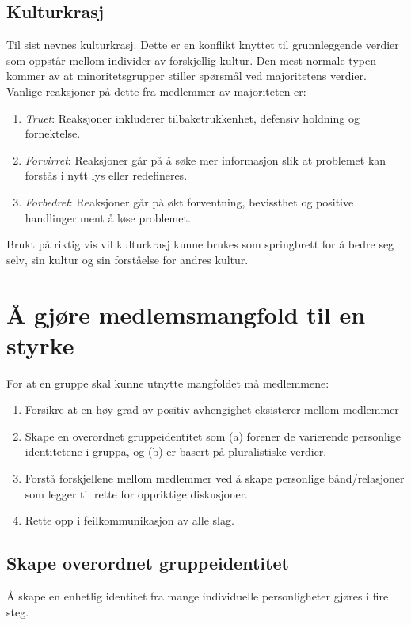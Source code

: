 \documentclass[11pt]{article}
\begin{document}
		\subsection{Kulturkrasj}
			Til sist nevnes kulturkrasj. Dette er en konflikt knyttet til grunnleggende verdier som oppstår mellom individer av forskjellig kultur. Den mest normale typen kommer av at minoritetsgrupper stiller spørsmål ved majoritetens verdier. Vanlige reaksjoner på dette fra medlemmer av majoriteten er:
			\begin{enumerate}
				\item \textit{Truet}: Reaksjoner inkluderer tilbaketrukkenhet, defensiv holdning og fornektelse.
				\item \textit{Forvirret}: Reaksjoner går på å søke mer informasjon slik at problemet kan forstås i nytt lys eller redefineres.
				\item \textit{Forbedret}: Reaksjoner går på økt forventning, bevissthet og positive handlinger ment å løse problemet.
			\end{enumerate}
			
			Brukt på riktig vis vil kulturkrasj kunne brukes som springbrett for å bedre seg selv, sin kultur og sin forståelse for andres kultur.
			
	\section{Å gjøre medlemsmangfold til en styrke}
		For at en gruppe skal kunne utnytte mangfoldet må medlemmene:
		\begin{enumerate}
			\item Forsikre at en høy grad av positiv avhengighet eksisterer mellom medlemmer
			\item Skape en overordnet gruppeidentitet som (a) forener de varierende personlige identitetene i gruppa, og (b) er basert på pluralistiske verdier.
			\item Forstå forskjellene mellom medlemmer ved å skape personlige bånd/relasjoner som legger til rette for oppriktige diskusjoner.
			\item Rette opp i feilkommunikasjon av alle slag.
		\end{enumerate}
		
		\subsection{Skape overordnet gruppeidentitet}
			Å skape en enhetlig identitet fra mange individuelle personligheter gjøres i fire steg.
			
\end{document}
